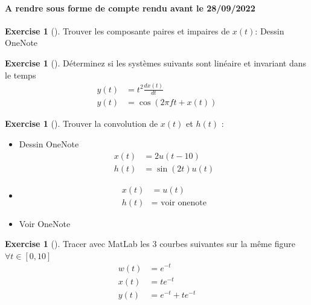 \documentclass{article}
\theoremstyle{plain}%
\theoremstyle{definition}
\newtheorem{xca}[exmp]{Exercise}
\theoremstyle{remark}
\begin{document}
\paragraph*{A rendre sous forme de compte rendu avant le 28/09/2022}
\begin{xca}[]
    Trouver les composante paires et impaires de $ x(t) $: Dessin OneNote
\end{xca}
\begin{xca}[]
    Déterminez si les systèmes suivants sont linéaire et invariant dans le temps \begin{align}
        y(t) &= t^2 \frac{dx(t)}{dt} \\
        y(t) &= \cos (2 \pi ft + x(t))
    \end{align}
\end{xca}
\begin{xca}[]
    Trouver la convolution de $ x(t) $ et $ h(t) $ : 
    \begin{itemize}
        \item Dessin OneNote
        \begin{align*}
            x(t) &= 2 u(t-10) \\
            h(t) &= \sin (2t) u(t)
        \end{align*}
        \item \begin{align*}
            x(t) &= u(t) \\
            h(t) &=\text{ voir onenote}
        \end{align*}
        \item Voir OneNote
    \end{itemize}
\end{xca}
\begin{xca}[]
    Tracer avec MatLab les 3 courbes suivantes sur la même figure $ \forall t \in [0, 10] $ 
    \begin{align}
        w(t) &= e^{-t} \\
        x(t) &= te^{-t} \\
        y(t) &= e^{-t} + te^{-t}
    \end{align}
\end{xca}
\end{document}
